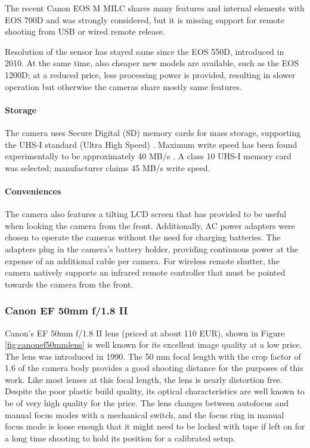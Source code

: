 The recent Canon EOS M MILC shares many features and internal elements with EOS 700D and was strongly considered, but it is missing support for remote shooting from USB or wired remote release.

Resolution of the sensor has stayed same since the EOS 550D, introduced in 2010.
At the same time, also cheaper new models are available, such as the EOS 1200D; at a reduced price, less processing power is provided, resulting in slower operation but otherwise the cameras share mostly same features.

\paragraph{Storage}
The camera uses Secure Digital (SD) memory cards for mass storage, supporting the UHS-I standard (Ultra High Speed) \cite{sdcardspeed}.
Maximum write speed has been found experimentally to be approximately 40 MB/s \cite{magiclanternforum}.
A class 10 UHS-I memory card was selected; manufacturer claims 45 MB/s write speed.

\paragraph{Conveniences}
The camera also features a tilting LCD screen that has provided to be useful when looking the camera from the front.
Additionally, AC power adapters were chosen to operate the cameras without the need for charging batteries.
The adapters plug in the camera's battery holder, providing continuous power at the expense of an additional cable per camera.
For wireless remote shutter, the camera natively supports an infrared remote controller that must be pointed towards the camera from the front.


\subsubsection{Canon EF 50mm f/1.8 II}

Canon's EF 50mm f/1.8 II lens (priced at about 110 EUR), shown in Figure \ref{fig:canonef50mmlens} is well known for its excellent image quality at a low price.
The lens was introduced in 1990.
The 50 mm focal length with the crop factor of 1.6 of the camera body provides a good shooting distance for the purposes of this work.
Like most lenses at this focal length, the lens is nearly distortion free.
Despite the poor plastic build quality, its optical characteristics are well known to be of very high quality for the price.
The lens changes between autofocus and manual focus modes with a mechanical switch, and the focus ring in manual focus mode is loose enough that it might need to be locked with tape if left on for a long time shooting to hold its position for a calibrated setup.

